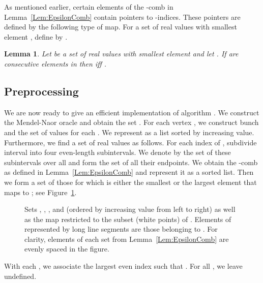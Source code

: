 \documentclass[11pt]{article}
\newtheorem{Lem}{Lemma}
\begin{document}
As mentioned earlier, certain elements of the -comb in Lemma~\ref{Lem:EpsilonComb} contain pointers to -indices.
These pointers are defined by the following type of map. For a set  of real values with smallest element , define
 by .
\begin{Lem}\label{Lem:tau}
Let  be a set of real values with smallest element  and let  .
If  are consecutive elements in  then  iff .
\end{Lem}

\subsection{Preprocessing}\label{subsec:Preproc}
We are now ready to give an efficient implementation of algorithm . We construct the Mendel-Naor oracle
and obtain the set . For each vertex , we construct bunch  and the set  of
values  for each . We represent  as a list sorted by increasing value. Furthermore,
we find a set  of real values as follows. For each index  of , subdivide interval
 into four even-length subintervals. We denote by  the set
of these subintervals over all  and form the set  of all their endpoints.
We obtain the -comb  as defined in Lemma~\ref{Lem:EpsilonComb} and
represent it as a sorted list. Then we form a set  of those 
for which  is either the smallest or the largest element that  maps to ; see Figure~\ref{fig:Pointers}.
\begin{figure}\centerline{}
\caption{Sets , , , and  (ordered by increasing value from left
         to right) as well as the map  restricted to the subset  (white points) of
         . Elements of  represented by long line segments are those
         belonging to . For clarity, elements of each set  from Lemma~\ref{Lem:EpsilonComb}
         are evenly spaced in the figure.}
\label{fig:Pointers}
\end{figure}
With each , we associate the largest even index  such that
. For all , we leave
 undefined.
\end{document}
